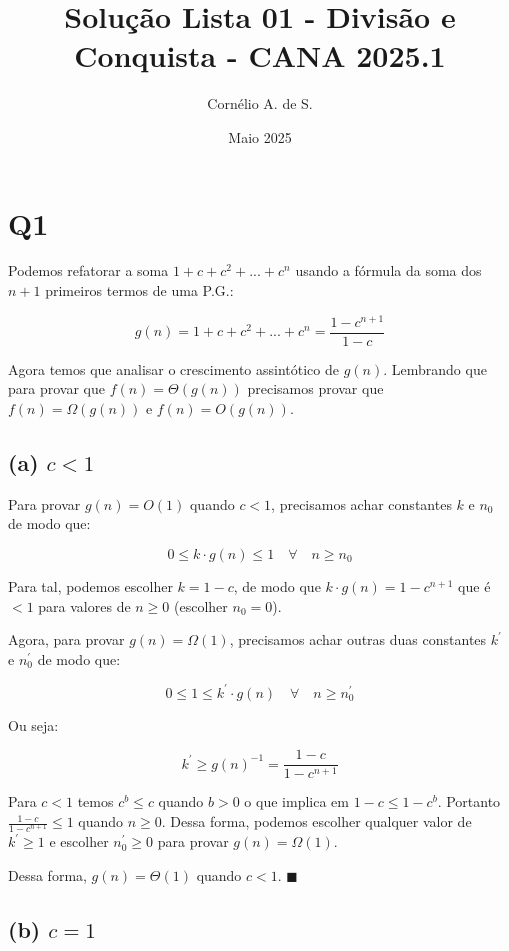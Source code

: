 \documentclass[12pt, a4paper]{article}
\title{Solução Lista 01 - Divisão e Conquista - CANA 2025.1}
\author{Cornélio A. de S.}
\date{Maio 2025}
\begin{document}
\maketitle




\section*{Q1}

Podemos refatorar a soma $1+c+c^2+...+c^n$ usando a fórmula da soma dos $n+1$ primeiros termos de uma P.G.:

\[ g(n) = 1+c+c^2+...+c^n = \frac{1-c^{n+1}}{1-c} \]

Agora temos que analisar o crescimento assintótico de $g(n)$. Lembrando que para provar que $f(n)=\Theta(g(n))$ precisamos provar que $f(n)=\Omega(g(n))$ e $f(n)=O(g(n))$.

\subsection*{(a) $c<1$}

Para provar $g(n) = O(1)$ quando $c<1$, precisamos achar constantes $k$ e $n_0$ de modo que:

\[ 0 \leq k \cdot g(n) \leq 1 \quad \forall \quad n \geq n_0 \]

Para tal, podemos escolher $k=1-c$, de modo que $k \cdot g(n) = 1-c^{n+1}$ que é $< 1$ para valores de $n \geq 0$ (escolher $n_0 = 0$).

Agora, para provar $g(n) = \Omega(1)$, precisamos achar outras duas constantes $k^{'}$ e $n^{'}_{0}$ de modo que:

\[ 0 \leq 1 \leq k^{'} \cdot g(n) \quad \forall \quad n \geq n^{'}_{0} \]

Ou seja:

\[ k^{'} \geq g(n)^{-1} = \frac{1-c}{1-c^{n+1}} \]

Para $c<1$ temos $c^b \leq c$ quando $b>0$ o que implica em $1-c \leq 1-c^b$. Portanto $\frac{1-c}{1-c^{n+1}} \leq 1$ quando $n \geq 0$. Dessa forma, podemos escolher qualquer valor de $k^{'} \geq 1$ e escolher $n^{'}_{0} \geq 0$ para provar $g(n) = \Omega(1)$.


Dessa forma, $g(n)=\Theta(1)$ quando $c < 1$. $\blacksquare$

\subsection*{(b) $c=1$}
\end{document}
